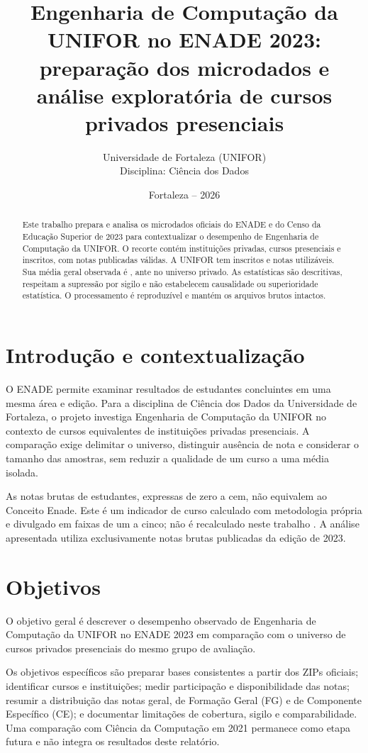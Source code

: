 \documentclass[12pt,a4paper]{article}
\title{Engenharia de Computação da UNIFOR no ENADE 2023:\\
preparação dos microdados e análise exploratória de cursos privados presenciais}
\author{Universidade de Fortaleza (UNIFOR)\\Disciplina: Ciência dos Dados}
\date{Fortaleza -- 2026}
\begin{document}
\maketitle

\begin{abstract}
Este trabalho prepara e analisa os microdados oficiais do ENADE e do Censo da
Educação Superior de 2023 para contextualizar o desempenho de Engenharia de
Computação da UNIFOR. O recorte contém \TotalIES{} instituições privadas,
\TotalCursos{} cursos presenciais e \TotalInscritos{} inscritos, com
\TotalNotas{} notas publicadas válidas. A UNIFOR tem \UniforInscritos{}
inscritos e \UniforNotas{} notas utilizáveis. Sua média geral observada é
\MediaUniforGeral{}, ante \MediaPrivadasGeral{} no universo privado.
As estatísticas são descritivas, respeitam a supressão por sigilo e não
estabelecem causalidade ou superioridade estatística. O processamento é
reproduzível e mantém os arquivos brutos intactos.
\end{abstract}

\section{Introdução e contextualização}
O ENADE permite examinar resultados de estudantes concluintes em uma mesma
área e edição. Para a disciplina de Ciência dos Dados da Universidade de
Fortaleza, o projeto investiga Engenharia de Computação da UNIFOR no contexto
de cursos equivalentes de instituições privadas presenciais. A comparação
exige delimitar o universo, distinguir ausência de nota e considerar o tamanho
das amostras, sem reduzir a qualidade de um curso a uma média isolada.

As notas brutas de estudantes, expressas de zero a cem, não equivalem ao
Conceito Enade. Este é um indicador de curso calculado com metodologia própria
e divulgado em faixas de um a cinco; não é recalculado neste trabalho
\cite{conceito,notatecnica}. A análise apresentada utiliza exclusivamente
notas brutas publicadas da edição de 2023.

\section{Objetivos}
O objetivo geral é descrever o desempenho observado de Engenharia de Computação
da UNIFOR no ENADE 2023 em comparação com o universo de cursos privados
presenciais do mesmo grupo de avaliação.

Os objetivos específicos são preparar bases consistentes a partir dos ZIPs
oficiais; identificar cursos e instituições; medir participação e disponibilidade
das notas; resumir a distribuição das notas geral, de Formação Geral (FG) e de
Componente Específico (CE); e documentar limitações de cobertura, sigilo e
comparabilidade. Uma comparação com Ciência da Computação em 2021 permanece
como etapa futura e não integra os resultados deste relatório.
\end{document}
